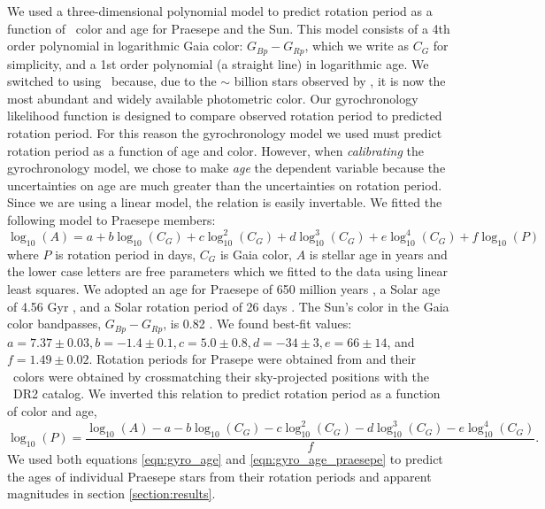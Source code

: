We used a three-dimensional polynomial model to predict rotation period as a
function of \gaia\ color and age for Praesepe and the Sun.
This model consists of a 4th order polynomial in logarithmic Gaia color:
$G_{Bp} - G_{Rp}$, which we write as $C_G$ for simplicity, and a 1st order
polynomial (a straight line) in logarithmic age.
We switched to using \gcolor\ because, due to the $\sim$ billion stars
observed by \gaia, it is now the most abundant and widely available
photometric color.
Our gyrochronology likelihood function is designed to compare observed
rotation period to predicted rotation period.
For this reason the gyrochronology model we used must predict rotation period
as a function of age and color.
However, when {\it calibrating} the gyrochronology model, we chose to make
{\it age} the dependent variable because the uncertainties on age are much
greater than the uncertainties on rotation period.
Since we are using a linear model, the relation is easily invertable.
We fitted the following model to Praesepe members:
\begin{equation}
    \log_{10}(A) = a + b\log_{10}(C_G) + c\log_{10}^2(C_G) +
    d\log_{10}^3(C_G) + e\log_{10}^4(C_G) + f\log_{10}(P)
\label{eqn:gyro_age}
\end{equation}
where $P$ is rotation period in days, $C_G$ is Gaia color, $A$ is stellar age
in years and the lower case letters are free parameters which we fitted to the
data using linear least squares.
We adopted an age for Praesepe of 650 million years , a
Solar age of 4.56 Gyr , and a Solar rotation period of 26
days .
The Sun's color in the Gaia color bandpasses, $G_{Bp} - G_{Rp}$, is 0.82
\citep{casagrande2018}.
We found best-fit values: $a = 7.37 \pm 0.03, b = -1.4 \pm 0.1, c = 5.0 \pm
0.8, d = -34 \pm 3, e = 66 \pm 14$, and $f = 1.49 \pm 0.02$.
Rotation periods for Prasepe were obtained from \citet{rebull} and their
\gaia\ colors were obtained by crossmatching their sky-projected positions
with the \gaia\ DR2 catalog.
We inverted this relation to predict rotation period as a function of color
and age,
\begin{equation}
    \log_{10}(P) = \frac{\log_{10}(A) - a - b\log_{10}(C_G) - c\log_{10}^2(C_G) -
    d\log_{10}^3(C_G) - e\log_{10}^4(C_G)}{f}.
\label{eqn:gyro_age_praesepe}
\end{equation}
We used both equations \ref{eqn:gyro_age} and \ref{eqn:gyro_age_praesepe} to
predict the ages of individual Praesepe stars from their rotation periods and
apparent magnitudes in section \ref{section:results}.

